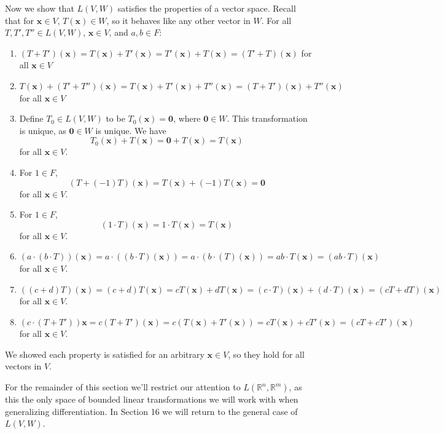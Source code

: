 \documentclass{article}
\newcommand{\R}{\mathbb{R}}
\newcommand{\x}{\mathbf{x}}
\newcommand{\ze}{\mathbf{0}}
\theoremstyle{definition}
\begin{document}
	
	Now we show that $ L(V,W) $ satisfies the properties of a vector space. Recall that for $ \x\in V $, $ T(\x)\in W $, so it behaves like any other vector in $ W $. For all $ T,T',T''\in L(V,W) $, $ \x\in V  $, and $ a,b\in F $: 
	\begin{enumerate}
		\item $ (T+T')(\x) = T(\x) + T'(\x) = T'(\x) + T(\x) = (T'+T)(\x)$ for all $ \x\in V $
		\item $ T(\x) +(T' +T'')(\x) = T(\x) + T'(\x) + T''(\x) = (T+T')(\x) + T''(\x)  $ for all $ \x\in V $
		\item Define $ T_0 \in L(V,W) $ to be $ T_0(\x) = \ze $, where $ \ze \in W $. This transformation is unique, as $ \ze\in W $ is unique. We have 
		$$ T_0(\x) + T(\x) = \ze + T(\x) = T(\x) $$  
		for all $ \x\in V $. 
		\item For $ 1\in F $, 
		$$ (T+(-1)T)(\x) = T(\x)+(-1)T(\x)=\ze $$ 	for all $ \x\in V $. 
		\item For $ 1\in F $, 
		$$ (1\cdot T)(\x)=1\cdot T(\x)=T(\x) $$ 	for all $ \x\in V $. 
		\item $ (a\cdot(b\cdot T))(\x) = a\cdot ((b\cdot T)(\x))= a\cdot (b\cdot (T)(\x))=ab\cdot T(\x) = (ab\cdot T)(\x)$ 	for all $ \x\in V $. 
		\item $ ((c+d)T)(\x)=(c+d)T(\x)=cT(\x)+dT(\x)=(c\cdot T)(\x) + (d\cdot T)(\x) = (cT + dT)(\x)$	for all $ \x\in V $. 
		\item $(c\cdot(T+T'))\x = c(T+T')(\x)=c\left( T(\x) + T'(\x)  \right)= cT(\x) + cT'(\x) = (cT+cT')(\x) $	for all $ \x\in V $. 
	\end{enumerate}
	We showed each property is satisfied for an arbitrary $ \x\in V $, so they hold for all vectors in $ V $. 
	
	For the remainder of this section we'll restrict our attention to $ L(\R^n,\R^m) $, as this the only space of bounded linear transformations we will work with when generalizing differentiation. In Section 16 we will return to the general case of $ L(V,W) $.
	
\end{document}
